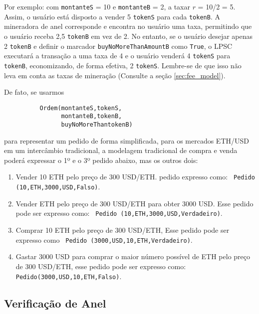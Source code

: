 \documentclass[UTF8,nofonts]{article}
\begin{document}
\begin{multicols}{2}
Por exemplo: com \verb|montanteS| = 10 e \verb|montanteB| = 2, a taxar $r$ = 10/2 = 5. Assim, o usuário está disposto a vender 5 \verb|tokenS| para cada \verb|tokenB|. A mineradora de anel corresponde e encontra no usuário uma taxa, permitindo que o usuário receba 2,5  \verb|tokenB| em vez de 2. No entanto, se o usuário desejar apenas 2 \verb|tokenB| e definir o marcador \verb|buyNoMoreThanAmountB| como \verb|True|, o LPSC executará a transação a uma taxa de 4 e o usuário venderá 4 \verb|tokenS| para \verb|tokenB|, economizando, de forma efetiva, 2 \verb|tokenS|. Lembre-se de que isso não leva em conta as taxas de mineração  (Consulte a seção \ref{sec:fee_model}).

De fato, se usarmos


\begin{verbatim}
	      Ordem(montanteS,tokenS,
	            montanteB,tokenB,
	            buyNoMoreThantokenB)
\end{verbatim}

para representar um pedido de forma simplificada, para os mercados ETH/USD em um intercâmbio tradicional, a modelagem tradicional de compra e venda poderá expressar o 1º e o 3º pedido abaixo, mas os outros dois:

\begin{enumerate}

	\item Vender 10 ETH pelo preço de 300 USD/ETH. pedido expresso como: \verb| Pedido (10,ETH,3000,USD,Falso)|.
	
	\item Vender ETH pelo preço de 300 USD/ETH para obter 3000 USD. Esse pedido pode ser expresso como: \verb| Pedido (10,ETH,3000,USD,Verdadeiro)|.
	
	\item Comprar 10 ETH pelo preço de 300 USD/ETH, Esse pedido pode ser expresso como \verb| Pedido (3000,USD,10,ETH,Verdadeiro)|.
	
	\item Gastar 3000 USD para comprar o maior número possível de ETH pelo preço de 300 USD/ETH, esse pedido pode ser expresso como: \verb| Pedido(3000,USD,10,ETH,Falso)|.
	
\end{enumerate}

\subsection{Verificação de Anel\label{sec:ring_verification}}


\end{multicols}
\end{document}
